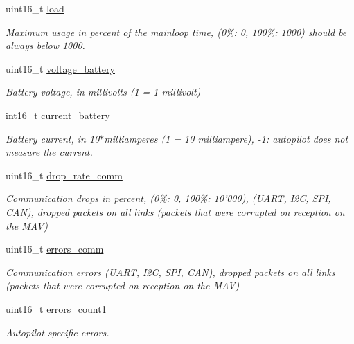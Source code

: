 \begin{DoxyCompactItemize}
uint16\+\_\+t \hyperlink{struct____mavlink__sys__status__t_a2c25af241ac32995f2194d53dcaaf3e2}{load}
\begin{DoxyCompactList}\small\item\em Maximum usage in percent of the mainloop time, (0\%\+: 0, 100\%\+: 1000) should be always below 1000. \end{DoxyCompactList}\item 
uint16\+\_\+t \hyperlink{struct____mavlink__sys__status__t_a47f55c2ec3aeb48c924092e2a46ffc99}{voltage\+\_\+battery}
\begin{DoxyCompactList}\small\item\em Battery voltage, in millivolts (1 = 1 millivolt) \end{DoxyCompactList}\item 
int16\+\_\+t \hyperlink{struct____mavlink__sys__status__t_a78ab5021909544c255827e8b2bd23034}{current\+\_\+battery}
\begin{DoxyCompactList}\small\item\em Battery current, in 10$\ast$milliamperes (1 = 10 milliampere), -\/1\+: autopilot does not measure the current. \end{DoxyCompactList}\item 
uint16\+\_\+t \hyperlink{struct____mavlink__sys__status__t_a08c165a0dcb2a852605e8abaaf9dfd78}{drop\+\_\+rate\+\_\+comm}
\begin{DoxyCompactList}\small\item\em Communication drops in percent, (0\%\+: 0, 100\%\+: 10'000), (U\+A\+R\+T, I2\+C, S\+P\+I, C\+A\+N), dropped packets on all links (packets that were corrupted on reception on the M\+A\+V) \end{DoxyCompactList}\item 
uint16\+\_\+t \hyperlink{struct____mavlink__sys__status__t_af144d0a152da70babf5ec86593e88700}{errors\+\_\+comm}
\begin{DoxyCompactList}\small\item\em Communication errors (U\+A\+R\+T, I2\+C, S\+P\+I, C\+A\+N), dropped packets on all links (packets that were corrupted on reception on the M\+A\+V) \end{DoxyCompactList}\item 
uint16\+\_\+t \hyperlink{struct____mavlink__sys__status__t_a11e2c7144a8d17da05c2f070d919bfc5}{errors\+\_\+count1}
\begin{DoxyCompactList}\small\item\em Autopilot-\/specific errors. \end{DoxyCompactList}\item 

\end{DoxyCompactItemize}
